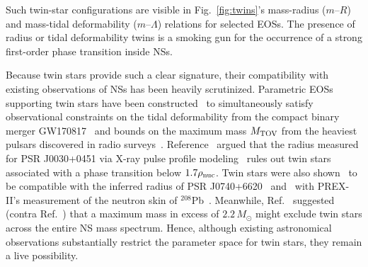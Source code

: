 \documentclass[aps,prl,twocolumn,superscriptaddress,footinbib]{revtex4-1}
\newcommand{\Msun}{\ensuremath{\,M_{\odot}}}
\begin{document}
Such twin-star configurations are visible in Fig.~\ref{fig:twins}'s mass-radius ($m$--$R$) and mass-tidal deformability ($m$--$\Lambda$) relations for selected EOSs. The presence of radius or tidal deformability twins is a smoking gun for the occurrence of a strong first-order phase transition inside NSs.

Because twin stars provide such a clear signature, their compatibility with existing observations of NSs has been heavily scrutinized. Parametric EOSs supporting twin stars have been constructed~\cite{PaschalidisYagi2018,MontanaTolos2019,ChristianZacchi2019,PangDietrich2020,WangShi2022} to simultaneously satisfy observational constraints on the tidal deformability from the compact binary merger GW170817~\cite{GW170817,LVC_GW170817source,LVC_GW170817eos} and bounds on the maximum mass $M_{\rm TOV}$ from the heaviest pulsars discovered in radio surveys~\cite{AntoniadisFreire2013,CromartieFonseca2020,FonsecaCromartie2021}. Reference~\cite{ChristianSchaffner-Bielich2020} argued that the radius measured for PSR J0030+0451 via X-ray pulse profile modeling~\cite{RileyWatts2019,MillerLamb2019} rules out twin stars associated with a phase transition below $1.7\rho_{\rm nuc}$. Twin stars were also shown~\cite{ChristianSchaffner-Bielich2022} to be compatible with the inferred radius of PSR J0740+6620~\cite{RileyWatts2021,MillerLamb2021} and~\cite{LiSedrakian2021} with PREX-II's measurement of the neutron skin of $^{208}$Pb~\cite{AdhikariAlbataineh2021}. Meanwhile, Ref.~\cite{ChristianSchaffner-Bielich2021_Mmax} suggested (contra Ref.~\cite{TsaloukidisKoliogiannis2022}) that a maximum mass in excess of $2.2\Msun$ might exclude twin stars across the entire NS mass spectrum. Hence, although existing astronomical observations substantially restrict the parameter space for twin stars, they remain a live possibility.
\end{document}
